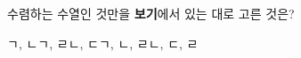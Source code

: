 수렴하는 수열인 것만을 \textbf{보기}에서 있는 대로 고른 것은? 
\begin{choices32}{ㄱ, ㄴ}{ㄱ, ㄹ}{ㄴ, ㄷ}{ㄱ, ㄴ, ㄹ}{ㄴ, ㄷ, ㄹ}\end{choices32}
